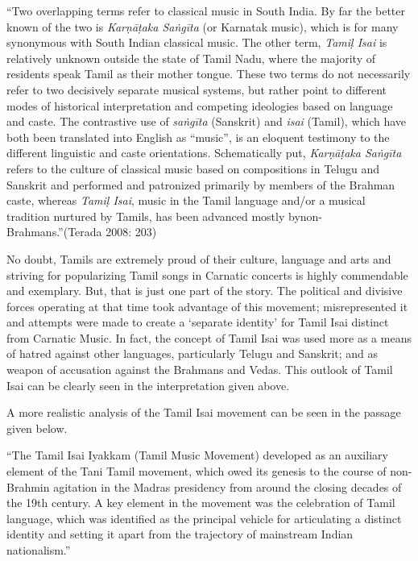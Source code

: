 \begin{myquote}
“Two overlapping terms refer to classical music in South India. By far the better known of the two is \textit{Karṇāṭaka Saṅgīta} (or Karnatak music), which is for many synonymous with South Indian classical music. The other term, \textit{Tamiḷ Isai} is relatively unknown outside the state of Tamil Nadu, where the majority of residents speak Tamil as their mother tongue. These two terms do not necessarily refer to two decisively separate musical systems, but rather point to different modes of historical interpretation and competing ideologies based on language and caste. The contrastive use of \textit{saṅgīta} (Sanskrit) and \textit{isai} (Tamil), which have both been translated into English as “music”, is an eloquent testimony to the different linguistic and caste orientations. Schematically put, \textit{Karṇāṭaka Saṅgīta} refers to the culture of classical music based on compositions in Telugu and Sanskrit and performed and patronized primarily by members of the Brahman caste, whereas \textit{Tamiḷ Isai}, music in the Tamil language and/or a musical tradition nurtured by Tamils, has been advanced mostly by\break non-Brahmans.”\hfill (Terada 2008: 203)
\end{myquote}

\vskip 4pt

No doubt, Tamils are extremely proud of their culture, language and arts and striving for popularizing Tamil songs in Carnatic concerts is highly commendable and exemplary. But, that is just one part of the story. The political and divisive forces operating at that time took advantage of this movement; misrepresented it and attempts were made to create a ‘separate identity’ for Tamil Isai distinct from Carnatic Music. In fact, the concept of Tamil Isai was used more as a means of hatred against other languages, particularly Telugu and Sanskrit; and as weapon of accusation against the Brahmans and Vedas. This outlook of Tamil Isai can be clearly seen in the interpretation given above.

\vskip 4pt

A more realistic analysis of the Tamil Isai movement can be seen in the passage given below.

\vskip 4pt

\begin{myquote}
“The Tamil Isai Iyakkam (Tamil Music Movement) developed as an auxiliary element of the Tani Tamil movement, which owed its genesis to the course of non-Brahmin agitation in the Madras presidency from around the closing decades of the 19th century. A key element in the movement was the celebration of Tamil language, which was identified as the principal vehicle for articulating a distinct identity and setting it apart from the trajectory of mainstream Indian nationalism.”
\end{myquote}



